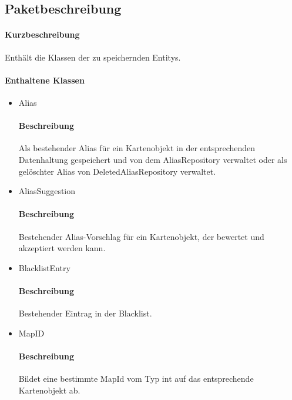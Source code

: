 \subsection{Paketbeschreibung}%
\paragraph*{Kurzbeschreibung}
    Enthält die Klassen der zu speichernden Entitys.
\paragraph*{Enthaltene Klassen}
\begin{itemize}
    \item Alias
    		\paragraph*{Beschreibung}
            Als bestehender Alias für ein Kartenobjekt in der entsprechenden Datenhaltung gespeichert und von 
            dem AliasRepository verwaltet oder als gelöschter Alias von DeletedAliasRepository verwaltet.
    \item AliasSuggestion
    		\paragraph*{Beschreibung}
          Bestehender Alias-Vorschlag für ein Kartenobjekt, der bewertet und akzeptiert werden kann.
    \item BlacklistEntry 
            \paragraph{Beschreibung}
          Bestehender Eintrag in der Blacklist.
    \item MapID
            \paragraph{Beschreibung} 
          Bildet eine bestimmte MapId vom Typ int auf das entsprechende Kartenobjekt ab.
\end{itemize}
